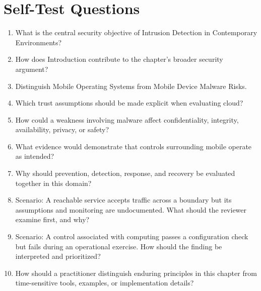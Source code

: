 \documentclass[11pt]{article}
\begin{document}
\section*{Self-Test Questions}
\begin{enumerate}
\item What is the central security objective of Intrusion Detection in Contemporary Environments?
\item How does Introduction contribute to the chapter's broader security argument?
\item Distinguish Mobile Operating Systems from Mobile Device Malware Risks.
\item Which trust assumptions should be made explicit when evaluating cloud?
\item How could a weakness involving malware affect confidentiality, integrity, availability, privacy, or safety?
\item What evidence would demonstrate that controls surrounding mobile operate as intended?
\item Why should prevention, detection, response, and recovery be evaluated together in this domain?
\item Scenario: A reachable service accepts traffic across a boundary but its assumptions and monitoring are undocumented. What should the reviewer examine first, and why?
\item Scenario: A control associated with computing passes a configuration check but fails during an operational exercise. How should the finding be interpreted and prioritized?
\item How should a practitioner distinguish enduring principles in this chapter from time-sensitive tools, examples, or implementation details?
\end{enumerate}
\end{document}
